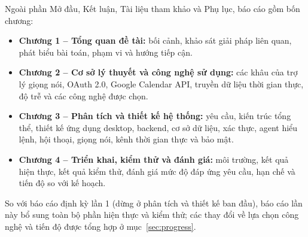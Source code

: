 Ngoài phần Mở đầu, Kết luận, Tài liệu tham khảo và Phụ lục, báo cáo gồm bốn chương:
\begin{itemize}
  \item \textbf{Chương 1 – Tổng quan đề tài:} bối cảnh, khảo sát giải pháp liên quan, phát biểu bài toán, phạm vi và hướng tiếp cận.
  \item \textbf{Chương 2 – Cơ sở lý thuyết và công nghệ sử dụng:} các khâu của trợ lý giọng nói, OAuth 2.0, Google Calendar API, truyền dữ liệu thời gian thực, độ trễ và các công nghệ được chọn.
  \item \textbf{Chương 3 – Phân tích và thiết kế hệ thống:} yêu cầu, kiến trúc tổng thể, thiết kế ứng dụng desktop, backend, cơ sở dữ liệu, xác thực, agent hiểu lệnh, hội thoại, giọng nói, kênh thời gian thực và bảo mật.
  \item \textbf{Chương 4 – Triển khai, kiểm thử và đánh giá:} môi trường, kết quả hiện thực, kết quả kiểm thử, đánh giá mức độ đáp ứng yêu cầu, hạn chế và tiến độ so với kế hoạch.
\end{itemize}
So với báo cáo định kỳ lần 1 (dừng ở phân tích và thiết kế ban đầu), báo cáo lần này bổ sung toàn bộ phần hiện thực và kiểm thử; các thay đổi về lựa chọn công nghệ và tiến độ được tổng hợp ở mục~\ref{sec:progress}.
\clearpage

